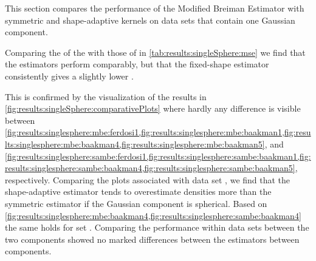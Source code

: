 
This section compares the performance of the Modified Breiman Estimator with symmetric and shape-adaptive kernels on data sets that contain one Gaussian component. 
	\begin{table}
		\centering
		
		\caption{Performance of the Modified Breiman Estimator with fixed-shaped and shape-adaptive kernels on the data sets with a single Gaussian component.} 	
		\label{tab:results:singleSphere:mse}
	\end{table}
	Comparing the \mses of the \mbe with those of \sambe in \cref{tab:results:singleSphere:mse} we find that the estimators perform comparably, but that the fixed-shape estimator consistently gives a slightly lower \mse. 

	\begin{figure*}
		\centering
		
		\caption{The density as estimated by \mbe and \sambe as a function of the known density of data sets \ferdosiOne through \baakmanFive.}
		\label{fig:results:singleSphere:comparativePlots}
	\end{figure*}
	This is confirmed by the visualization of the results in \cref{fig:results:singleSphere:comparativePlots} where hardly any difference is visible between \cref{fig:results:singlesphere:mbe:ferdosi1,fig:results:singlesphere:mbe:baakman1,fig:results:singlesphere:mbe:baakman4,fig:results:singlesphere:mbe:baakman5}, and \cref{fig:results:singlesphere:sambe:ferdosi1,fig:results:singlesphere:sambe:baakman1,fig:results:singlesphere:sambe:baakman4,fig:results:singlesphere:sambe:baakman5}, respectively. 
		Comparing the plots associated with data set \ferdosiOne, we find that the shape-adaptive estimator tends to overestimate densities more than the symmetric estimator if the Gaussian component is spherical.
		Based on \cref{fig:results:singlesphere:mbe:baakman4,fig:results:singlesphere:sambe:baakman4} the same holds for set \baakmanFour. 
	Comparing the performance within data sets between the two components showed no marked differences between the estimators between components.


